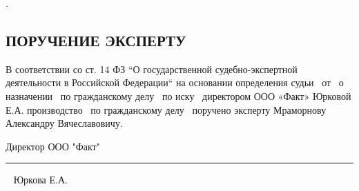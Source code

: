 \setcounter{page}{1}
\pagestyle{empty} %
%
%
%
%
.
\vspace{50mm}


\begin{center}
	\section{{\Large \textbf{ПОРУЧЕНИЕ ЭКСПЕРТУ}}}
\end{center}




В соответствии со ст. 14  ФЗ “О государственной судебно-экспертной деятельности в Российской Федерации“ на основании определения судьи \sud \,  от \dataopr  \, о назначении \opr \, по гражданскому делу \delonum \, по иску \isk \,  директором ООО «Факт»  Юрковой Е.А. производство \opr \, по гражданскому делу \delonum \, поручено эксперту    Мраморнову Александру Вячеславовичу. 






\vspace{30mm}

{Директор ООО "Факт"}\hfill   \rule{4cm}{0.1 mm} \,\,\,  Юркова Е.А.     